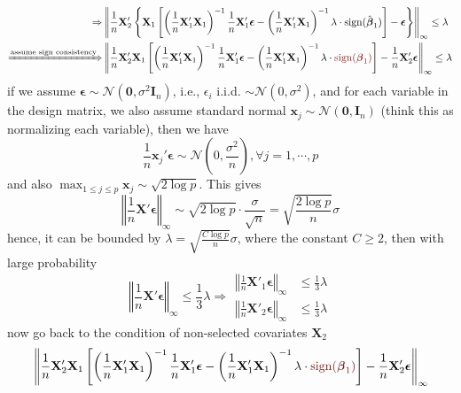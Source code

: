 \documentclass[twoside]{article}
\begin{document}
\begin{itemize}
\begin{align*}
        \Rightarrow & \left\Vert \frac{1}{n}\mathbf{X}_2'\left\{ \mathbf{X}_1 \left[ \left( \frac{1}{n}\mathbf{X}_1' \mathbf{X}_1 \right)^{-1} \frac{1}{n}\mathbf{X}_1'\boldsymbol{\epsilon} - \left( \frac{1}{n}\mathbf{X}_1' \mathbf{X}_1 \right)^{-1} \lambda \cdot \mathrm{sign}(\hat{\boldsymbol{\beta}}_1) \right] -\boldsymbol{\epsilon} \right\} \right\Vert _{\infty} \leq \lambda \\
        \xRightarrow{\text{assume sign consistency}} & \left\Vert \frac{1}{n}\mathbf{X}_2' \mathbf{X}_1 \left[ \left( \frac{1}{n}\mathbf{X}_1' \mathbf{X}_1 \right)^{-1} \frac{1}{n}\mathbf{X}_1'\boldsymbol{\epsilon} - \left( \frac{1}{n}\mathbf{X}_1' \mathbf{X}_1 \right)^{-1} \lambda \cdot \textcolor{myred}{\mathrm{sign}({\boldsymbol{\beta}}_1)} \right]  - \frac{1}{n}\mathbf{X}_2'\boldsymbol{\epsilon} \right\Vert _{\infty} \leq \lambda 
    \end{align*}
    if we assume $\boldsymbol{\epsilon}\sim \mathcal{N}(\mathbf{0},\sigma^2 \mathbf{I}_n)$, i.e., $\epsilon_i$ i.i.d. $\sim \mathcal{N}({0},\sigma^2)$, and for each variable in the design matrix, we also assume standard normal $\mathbf{x}_j\sim \mathcal{N}(\mathbf{0},\mathbf{I}_n)$ (think this as normalizing each variable), then we have 
    $$
    \frac{1}{n}\mathbf{x}_j'\boldsymbol{\epsilon}\sim \mathcal{N}\left(0,\frac{\sigma^2}{n}\right),\forall j=1,\cdots,p
    $$
    and also $ \max_{1\leq j\leq p}\mathbf{x}_j \sim \sqrt{2\log p}$. This gives
    $$
    \left\Vert \frac{1}{n}\mathbf{X}'\boldsymbol{\epsilon} \right\Vert _{\infty} \sim \sqrt{2 \log p}\cdot \frac{\sigma}{\sqrt{n}} = \sqrt{\frac{2\log p}{n}}\sigma
    $$
    hence, it can be bounded by $\lambda = \sqrt{\frac{C\log p}{n}}\sigma $, where the constant $C\geq 2$, then with large probability
    $$
    \left\Vert \frac{1}{n}\mathbf{X}'\boldsymbol{\epsilon} \right\Vert _{\infty} \leq \frac{1}{3}\lambda \Rightarrow \begin{aligned}
        \left\Vert \frac{1}{n}\mathbf{X}'_1\boldsymbol{\epsilon} \right\Vert _{\infty} &\leq \frac{1}{3}\lambda \\
        \left\Vert \frac{1}{n}\mathbf{X}'_2\boldsymbol{\epsilon} \right\Vert _{\infty} &\leq \frac{1}{3}\lambda 
    \end{aligned}
    $$
    now go back to the condition of non-selected covariates $\mathbf{X}_2$
    \begin{align*}
         & \left\Vert \frac{1}{n}\mathbf{X}_2' \mathbf{X}_1 \left[ \left( \frac{1}{n}\mathbf{X}_1' \mathbf{X}_1 \right)^{-1} \frac{1}{n}\mathbf{X}_1'\boldsymbol{\epsilon} - \left( \frac{1}{n}\mathbf{X}_1' \mathbf{X}_1 \right)^{-1} \lambda \cdot \textcolor{myred}{\mathrm{sign}({\boldsymbol{\beta}}_1)} \right]  - \frac{1}{n}\mathbf{X}_2'\boldsymbol{\epsilon} \right\Vert _{\infty} \\

\end{align*}
\end{itemize}
\end{document}
